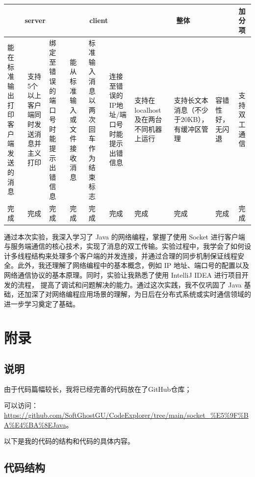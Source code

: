 \documentclass{article}
\begin{document}
	\begin{table}[!ht]
		\centering
		\begin{tabular}{|p{1.4cm}|p{1.4cm}|p{1.4cm}|p{1.4cm}|p{1.4cm}|p{1.4cm}|p{1.4cm}|p{1.4cm}|p{1.4cm}|p{1.4cm}|}
			\hline
			\multicolumn{3}{|c|}{server} & \multicolumn{3}{|c|}{client} & \multicolumn{3}{|c|}{整体} & 加分项 \\ \hline
			能在标准输出打印客户端发送的消息 & 支持5个以上客户端同时发送消息并主义打印 & 绑定至错误的端口号时能提示出错信息 & 能从标准输入或文件接收消息 & 标准输入消息以两次回车作为结束标志 & 连接至错误的IP地址/端口号时能提示出错信息 & 支持在localhost及在两台不同机器上运行 & 支持长文本消息（不少于20KB），有缓冲区管理 & 容错性好，无闪退 & 支持双工通信 \\ \hline
			完成 & 完成 & 完成 & 完成 & 完成 & 完成 & 完成 & 完成 & 完成 & 完成 \\ \hline
		\end{tabular}
	\end{table}
	
	通过本次实验，我深入学习了 Java 的网络编程，掌握了使用 Socket 进行客户端与服务端通信的核心技术，实现了消息的双工传输。实验过程中，我学会了如何设计多线程结构来处理多个客户端的并发连接，并通过合理的同步机制保证线程安全。此外，我还理解了网络编程中的基本概念，例如 IP 地址、端口号的配置以及网络通信协议的基本原理。同时，实验让我熟悉了使用 IntelliJ IDEA 进行项目开发的流程， 提高了调试和问题解决的能力。通过这次实践，我不仅巩固了 Java 基础，还加深了对网络编程应用场景的理解，为日后在分布式系统或实时通信领域的进一步学习奠定了基础。
	
	\section{附录}
	
	\subsection{说明}
	
	由于代码篇幅较长，我将已经完善的代码放在了GitHub仓库；
	
	可以访问：\url{https://github.com/SoftGhostGU/CodeExplorer/tree/main/socket_%E5%9F%BA%E4%BA%8EJava}。
	
	以下是我的代码的结构和代码的具体内容。
	
	\subsection{代码结构}
	
\end{document}
